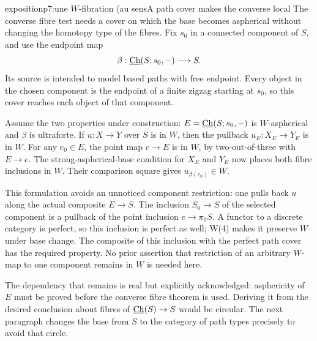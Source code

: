 \begin{dcomment}{exposition}{p7:une $W$-fibration (au sens}{A path cover makes the converse local}
The converse fibre test needs a cover on which the base becomes aspherical without changing the homotopy type of the fibres. Fix \(s_0\) in a connected component of \(S\), and use the endpoint map
\[
 \beta:\underline{\mathrm{Ch}}(S;s_0,-)\longrightarrow S .
\]
Its source is intended to model based paths with free endpoint. Every object in the chosen component is the endpoint of a finite zigzag starting at \(s_0\), so this cover reaches each object of that component.

Assume the two properties under construction: \(E=\underline{\mathrm{Ch}}(S;s_0,-)\) is \(W\)-aspherical and \(\beta\) is ultraforte. If \(u:X\to Y\) over \(S\) is in \(W\), then the pullback \(u_E:X_E\to Y_E\) is in \(W\). For any \(e_0\in E\), the point map \(e\to E\) is in \(W\), by two-out-of-three with \(E\to e\). The strong-aspherical-base condition for \(X_E\) and \(Y_E\) now places both fibre inclusions in \(W\). Their comparison square gives \(u_{\beta(e_0)}\in W\).

This formulation avoids an unnoticed component restriction: one pulls back \(u\) along the actual composite \(E\to S\). The inclusion \(S_0\to S\) of the selected component is a pullback of the point inclusion \(e\to\pi_0S\). A functor to a discrete category is perfect, so this inclusion is perfect as well; W(4) makes it preserve \(W\) under base change. The composite of this inclusion with the perfect path cover has the required property. No prior assertion that restriction of an arbitrary \(W\)-map to one component remains in \(W\) is needed here.

The dependency that remains is real but explicitly acknowledged: asphericity of \(E\) must be proved before the converse fibre theorem is used. Deriving it from the desired conclusion about fibres of \(\underline{\mathrm{Ch}}(S)\to S\) would be circular. The next paragraph changes the base from \(S\) to the category of path types precisely to avoid that circle.
\end{dcomment}


